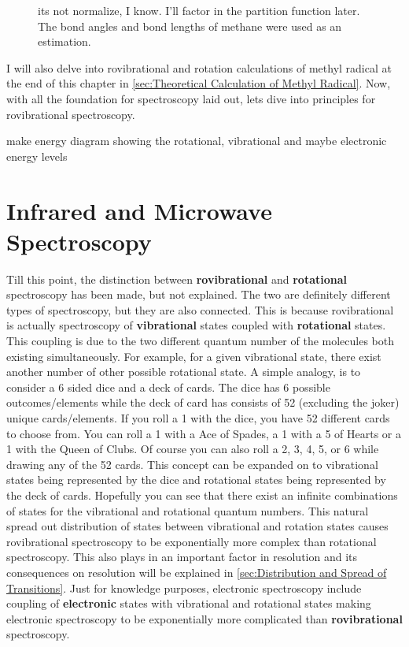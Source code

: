 \documentclass[11pt,a4paper]{book}
\newcommand{\imginput}[1]{} %
\begin{document}
	\begin{figure} [!ht]
		\centering
		\Large
		\def\svgwidth{\columnwidth}
		\resizebox{14cm}{!}{\imginput{images/Methyl-Radical-Angular-Momentum-Distribution.pdf_tex}}
		\caption{its not normalize, I know. I'll factor in the partition function later. The bond angles and bond lengths of methane were used as an estimation.}
		\label{fig:Methyl-Radical-Angular-Momentum-Distribution}
	\end{figure}
	
	\noindent
	I will also delve into rovibrational and rotation calculations of methyl radical at the end of this chapter in \autoref{sec:Theoretical Calculation of Methyl Radical}. Now, with all the foundation for spectroscopy laid out, lets dive into principles for rovibrational spectroscopy. 
	
	make energy diagram showing the rotational, vibrational and maybe electronic energy levels
	\section{Infrared and Microwave Spectroscopy}
		\label{sec:Infrared and Microwave Spectroscopy}
		Till this point, the distinction between \textbf{rovibrational} and \textbf{rotational} spectroscopy has been made, but not explained. The two are definitely different types of spectroscopy, but they are also connected. This is because rovibrational is actually spectroscopy of \textbf{vibrational} states coupled with \textbf{rotational} states. This coupling is due to the two different quantum number of the molecules both existing simultaneously. For example, for a given vibrational state, there exist another number of other possible rotational state. A simple analogy, is to consider a 6 sided dice and a deck of cards. The dice has 6 possible outcomes/elements while the deck of card has consists of 52 (excluding the joker) unique cards/elements. If you roll a 1 with the dice, you have 52 different cards to choose from. You can roll a 1 with a Ace of Spades, a 1 with a 5 of Hearts or a 1 with the Queen of Clubs. Of course you can also roll a 2, 3, 4, 5, or 6 while drawing any of the 52 cards. This concept can be expanded on to vibrational states being represented by the dice and rotational states being represented by the deck of cards. Hopefully you can see that there exist an infinite combinations of states for the vibrational and rotational quantum numbers. This natural spread out distribution of states between vibrational and rotation states causes rovibrational spectroscopy to be exponentially more complex than rotational spectroscopy. This also plays in an important factor in resolution and its consequences on resolution will be explained in \autoref{sec:Distribution and Spread of Transitions}. Just for knowledge purposes, electronic spectroscopy include coupling of \textbf{electronic} states with vibrational and rotational states making electronic spectroscopy to be exponentially more complicated than \textbf{rovibrational} spectroscopy.
		
\end{document}
